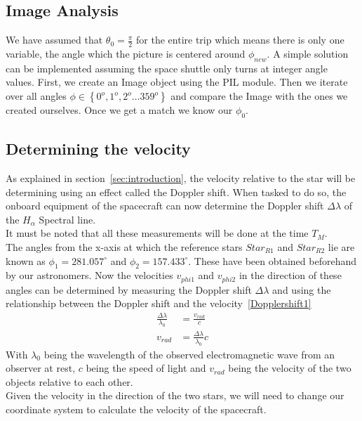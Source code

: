 \documentclass[reprint,english,notitlepage]{revtex4-2}
\begin{document}
\subsection{Image Analysis} \label{ssec: image analysis}
We have assumed that $ \theta_{0} = \frac{\pi}{2} $ for the entire trip which means there is only one variable, the angle which the picture is centered around $ \phi_{new} $.
A simple solution can be implemented assuming the space shuttle only turns at integer angle values.
First, we create an Image object using the PIL module.
Then we iterate over all angles $ \phi \in  \left\{ 0^{o}, 1^{o}, 2^{o} \dots 359 ^{o} \right\}  $ and compare the Image with the ones we created ourselves.
Once we get a match we know our $ \phi _{0} $.



\subsection{Determining the velocity}\label{subsec:determining-the-velocity}
As explained in section~\ref{sec:introduction}, the velocity relative to the star will be determining using an effect called the Doppler shift.
When tasked to do so, the onboard equipment of the spacecraft can now determine the Doppler shift $\Delta \lambda$ of the $H_{\alpha}$ Spectral line.\\
It must be noted that all these measurements will be done at the time $T_M$.\\
The angles from the x-axis at which the reference stars $Star_{R1}$ and $Star_{R2}$ lie are known as $\phi_1 = 281.057^{\circ}$ and $\phi_2 = 157.433^{\circ}$.
These have been obtained beforehand by our astronomers.
Now the velocities $v_{phi1}$ and $v_{phi2}$ in the direction of these angles can be determined by measuring the Doppler shift $\Delta \lambda$ and using the relationship between the Doppler shift and the velocity~\eqref{Dopplershift1}
\begin{align}
    \frac{\Delta \lambda}{\lambda_0} &= \frac{v_{rad}}{c} \label{Dopplershift1}\\
	v_{rad} &= \frac{\Delta \lambda}{\lambda_0} c \label{Dopplershift2}
\end{align}
With $\lambda_0$ being the wavelength of the observed electromagnetic wave from an observer at rest, $c$ being the speed of light and $v_{rad}$ being the velocity of the two objects relative to each other.\\
Given the velocity in the direction of the two stars, we will need to change our coordinate system to calculate the velocity of the spacecraft.
\end{document}
